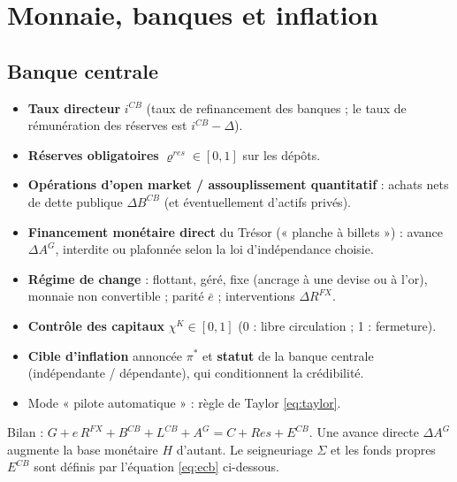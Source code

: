 \documentclass[11pt,a4paper]{article}
\newcommand{\og}{« }
\newcommand{\fg}{ »}
\begin{document}
\section{Monnaie, banques et inflation}
\label{sec:monnaie}

\subsection{Banque centrale}
\label{sec:bc}
\begin{joueur}
\begin{itemize}
\item \textbf{Taux directeur} $i^{CB}$ (taux de refinancement des banques ; le taux de rémunération des réserves est $i^{CB}-\Delta$).
\item \textbf{Réserves obligatoires} $\varrho^{res} \in [0,1]$ sur les dépôts.
\item \textbf{Opérations d'open market / assouplissement quantitatif} : achats nets de dette publique $\Delta B^{CB}$ (et éventuellement d'actifs privés).
\item \textbf{Financement monétaire direct} du Trésor (\og planche à billets\fg) : avance $\Delta A^{G}$, interdite ou plafonnée selon la loi d'indépendance choisie.
\item \textbf{Régime de change} : flottant, géré, fixe (ancrage à une devise ou à l'or), monnaie non convertible ; parité $\bar e$ ; interventions $\Delta R^{FX}$.
\item \textbf{Contrôle des capitaux} $\chi^K \in [0,1]$ (0 : libre circulation ; 1 : fermeture).
\item \textbf{Cible d'inflation} annoncée $\pi^\ast$ et \textbf{statut} de la banque centrale (indépendante / dépendante), qui conditionnent la crédibilité.
\item Mode \og pilote automatique\fg{} : règle de Taylor \eqref{eq:taylor}.
\end{itemize}
\end{joueur}

Bilan : $G + e\,R^{FX} + B^{CB} + L^{CB} + A^G = C + Res + E^{CB}$. Une avance directe $\Delta A^G$ augmente la base monétaire $H$ d'autant. Le seigneuriage $\Sigma$ et les fonds propres $E^{CB}$ sont définis par l'équation \eqref{eq:ecb} ci-dessous.
\end{document}
